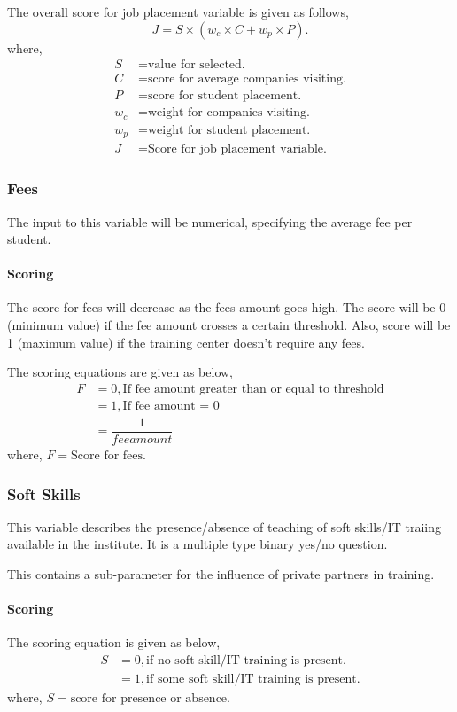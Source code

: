 \documentclass[oneside,twocolumn]{article}
\begin{document}
The overall score for job placement variable is given as follows,
\[
	J = S \times (w_c \times C + w_p \times P).
\]
where,
\begin{align*}
	S &= \text{value for selected.} \\
	C &= \text{score for average companies visiting.} \\
	P &= \text{score for student placement.} \\
	w_c &= \text{weight for companies visiting.} \\
	w_p &= \text{weight for student placement.} \\
	J &= \text{Score for job placement variable.}
\end{align*}

\subsubsection{Fees}
The input to this variable will be numerical, specifying the
average fee per student.
\paragraph{Scoring}
The score for fees will decrease as the fees amount goes high.
The score will be 0 (minimum value) if the fee amount crosses
a certain threshold. Also, score will be 1 (maximum value) if 
the training center doesn't require any fees.

The scoring equations are given as below,
\begin{align*}
	F &= 0, \text{If fee amount greater than or equal to threshold} \\
	  &= 1, \text{If fee amount = 0} \\
	  &= \dfrac{1}{fee amount}
\end{align*}
where, \(F = \text{Score for fees}\).

\subsubsection{Soft Skills}
This variable describes the presence/absence of teaching of
soft skills/IT traiing available in the institute. It is a
multiple type binary yes/no question.

This contains a sub-parameter for the influence of private
partners in training.

\paragraph{Scoring}
The scoring equation is given as below,
\begin{align*}
	S &= 0, \text{if no soft skill/IT training is present.} \\
	  &= 1, \text{if some soft skill/IT training is present.}
\end{align*}
where, \(S = \text{score for presence or absence.}\)
\end{document}

